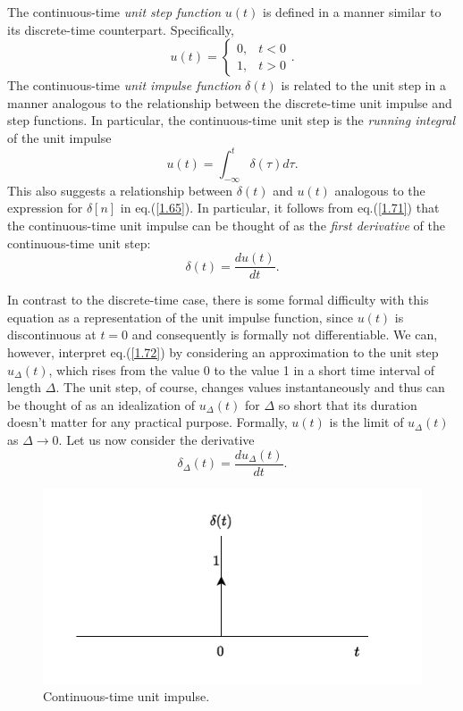 \documentclass[a4paper,10pt,twoside]{book}
\begin{document}
The continuous-time \textit{unit step function} $u(t)$ is defined in a manner similar to its discrete-time counterpart. Specifically,
\begin{equation}
    u(t) = \left\{\begin{array}{ll}{0,}&{t<0}\\{1,}&{t>0}\end{array}\right..
    \label{1.70}
\end{equation}
The continuous-time \textit{unit impulse function} $\delta(t)$ is related to the unit step in a manner analogous to the relationship between the discrete-time unit impulse and step functions. In particular, the continuous-time unit step is the \textit{running integral} of the unit impulse
\begin{equation}
    u(t)=\int_{-\infty}^{t}\delta(\tau)d\tau.
    \label{1.71}
\end{equation}
This also suggests a relationship between $\delta(t)$ and $u(t)$ analogous to the expression for $\delta[n]$ in eq.\;(\ref{1.65}). In particular, it follows from eq.\;(\ref{1.71}) that the continuous-time unit impulse can be thought of as the \textit{first derivative} of the continuous-time unit step:
\begin{equation}
    \delta(t)=\dfrac{du(t)}{dt}.
    \label{1.72}
\end{equation}

In contrast to the discrete-time case, there is some formal difficulty with this equation as a representation of the unit impulse function, since $u(t)$ is discontinuous at $t=0$ and consequently is formally not differentiable. We can, however, interpret eq.\;(\ref{1.72}) by considering an approximation to the unit step $u_{\Delta}(t)$, which rises from the value 0 to the value 1 in a short time interval of length $\Delta$. The unit step, of course, changes values instantaneously and thus can be thought of as an idealization of $u_{\Delta}(t)$ for $\Delta$ so short that its duration doesn't matter for any practical purpose. Formally, $u(t)$ is the limit of $u_{\Delta}(t)$ as $\Delta\to 0$. Let us now consider the derivative
\begin{equation}
    \delta_{\Delta}(t)=\dfrac{du_{\Delta}(t)}{dt}.
    \label{1.73}
\end{equation}

\begin{figure}[htbp]
    \centering
    \includegraphics[width=\linewidth]{Fig1.pdf}
    \caption{Continuous-time unit impulse.}
    \label{Fig1}
\end{figure}
\end{document}
